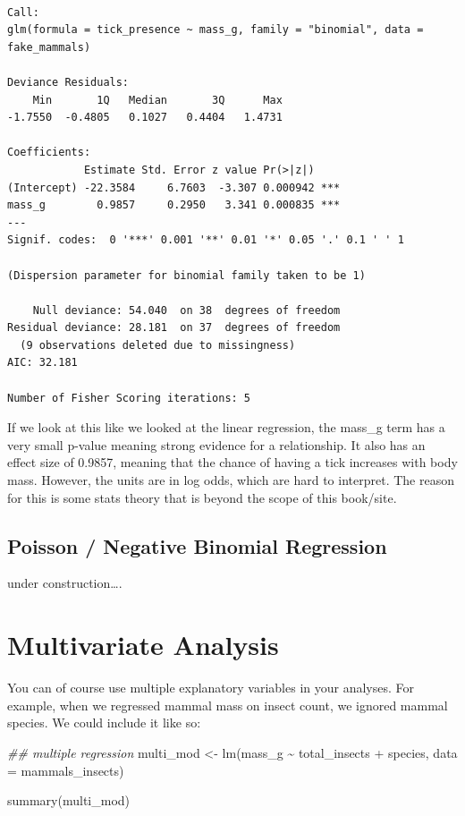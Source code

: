 \documentclass[
  letterpaper,
  DIV=11,
  numbers=noendperiod]{scrreprt}
\newenvironment{Shaded}{\begin{snugshade}}{\end{snugshade}}
\newcommand{\AttributeTok}[1]{\textcolor[rgb]{0.40,0.45,0.13}{#1}}
\newcommand{\DocumentationTok}[1]{\textcolor[rgb]{0.37,0.37,0.37}{\textit{#1}}}
\newcommand{\FunctionTok}[1]{\textcolor[rgb]{0.28,0.35,0.67}{#1}}
\newcommand{\NormalTok}[1]{\textcolor[rgb]{0.00,0.23,0.31}{#1}}
\newcommand{\OtherTok}[1]{\textcolor[rgb]{0.00,0.23,0.31}{#1}}
\newcommand{\SpecialCharTok}[1]{\textcolor[rgb]{0.37,0.37,0.37}{#1}}
\begin{document}
\begin{verbatim}

Call:
glm(formula = tick_presence ~ mass_g, family = "binomial", data = fake_mammals)

Deviance Residuals: 
    Min       1Q   Median       3Q      Max  
-1.7550  -0.4805   0.1027   0.4404   1.4731  

Coefficients:
            Estimate Std. Error z value Pr(>|z|)    
(Intercept) -22.3584     6.7603  -3.307 0.000942 ***
mass_g        0.9857     0.2950   3.341 0.000835 ***
---
Signif. codes:  0 '***' 0.001 '**' 0.01 '*' 0.05 '.' 0.1 ' ' 1

(Dispersion parameter for binomial family taken to be 1)

    Null deviance: 54.040  on 38  degrees of freedom
Residual deviance: 28.181  on 37  degrees of freedom
  (9 observations deleted due to missingness)
AIC: 32.181

Number of Fisher Scoring iterations: 5
\end{verbatim}

If we look at this like we looked at the linear regression, the mass\_g
term has a very small p-value meaning strong evidence for a
relationship. It also has an effect size of 0.9857, meaning that the
chance of having a tick increases with body mass. However, the units are
in log odds, which are hard to interpret. The reason for this is some
stats theory that is beyond the scope of this book/site.

\subsection{Poisson / Negative Binomial
Regression}\label{poisson-negative-binomial-regression}

under construction\ldots.

\section{Multivariate Analysis}\label{multivariate-analysis}

You can of course use multiple explanatory variables in your analyses.
For example, when we regressed mammal mass on insect count, we ignored
mammal species. We could include it like so:

\begin{Shaded}
\begin{Highlighting}[]
\DocumentationTok{\#\# multiple regression}
\NormalTok{multi\_mod }\OtherTok{\textless{}{-}} \FunctionTok{lm}\NormalTok{(mass\_g }\SpecialCharTok{\textasciitilde{}}\NormalTok{ total\_insects }\SpecialCharTok{+}\NormalTok{ species, }\AttributeTok{data =}\NormalTok{ mammals\_insects)}

\FunctionTok{summary}\NormalTok{(multi\_mod)}
\end{Highlighting}
\end{Shaded}
\end{document}

